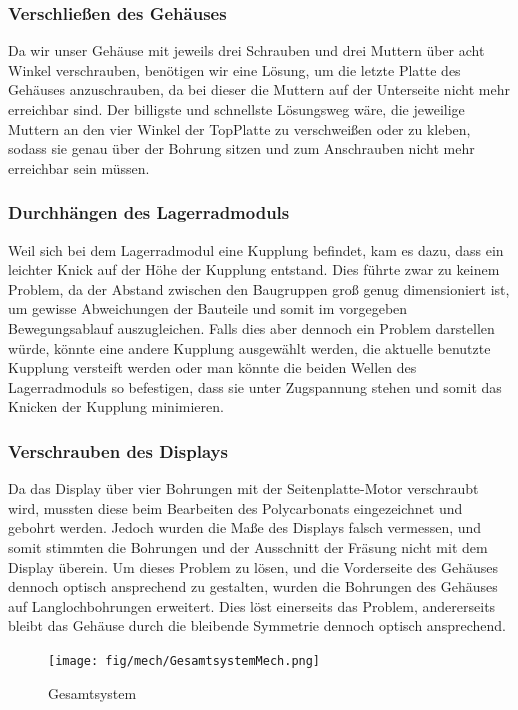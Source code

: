 \subsubsection{Verschließen des Gehäuses}
Da wir unser Gehäuse mit jeweils drei Schrauben und drei Muttern über acht Winkel verschrauben, benötigen
wir eine Lösung, um die letzte Platte des Gehäuses anzuschrauben, da bei dieser die Muttern auf der Unterseite nicht mehr erreichbar sind.
Der billigste und schnellste Lösungsweg wäre,
die jeweilige Muttern an den vier Winkel der TopPlatte zu verschweißen oder zu kleben, sodass sie genau über der
Bohrung sitzen und zum Anschrauben nicht mehr erreichbar sein müssen.

\subsubsection{Durchhängen des Lagerradmoduls}
Weil sich bei dem Lagerradmodul eine Kupplung befindet, kam es dazu, dass ein leichter Knick
auf der Höhe der Kupplung entstand.
Dies führte zwar zu keinem Problem, da der Abstand zwischen den Baugruppen groß genug dimensioniert ist, um gewisse Abweichungen der Bauteile und somit im
vorgegeben Bewegungsablauf auszugleichen.
Falls dies aber dennoch ein Problem darstellen würde, könnte eine andere Kupplung ausgewählt werden, die aktuelle benutzte Kupplung versteift werden oder
man könnte die beiden Wellen des Lagerradmoduls so befestigen, dass sie unter
Zugspannung stehen und somit das Knicken der Kupplung minimieren.

\subsubsection{Verschrauben des Displays}
Da das Display über vier Bohrungen mit der Seitenplatte-Motor verschraubt wird, mussten diese
beim Bearbeiten des Polycarbonats eingezeichnet und gebohrt werden.
Jedoch wurden die Maße des Displays falsch vermessen, und somit stimmten die Bohrungen und der Ausschnitt
der Fräsung nicht mit dem Display überein.
Um dieses Problem zu lösen, und die Vorderseite des Gehäuses dennoch optisch ansprechend zu gestalten, wurden die Bohrungen
des Gehäuses auf Langlochbohrungen erweitert.
Dies löst einerseits das Problem, andererseits
bleibt das Gehäuse durch die bleibende Symmetrie dennoch optisch ansprechend.

\begin{figure}[H]
    \centering
    \texttt{[image: fig/mech/GesamtsystemMech.png]}
    \caption{Gesamtsystem}
    \label{fig:GesamtsystemEcht}
\end{figure}

